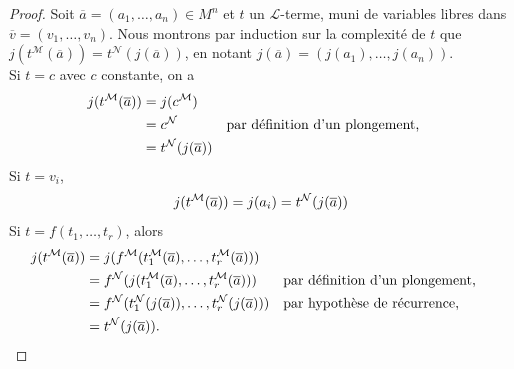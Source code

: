 \begin{proof}
Soit $\overline{a}=(a_1,\dots,a_n) \in M^n$ et $t$ un $\mathcal{L}$-terme, muni de variables libres dans $\overline{v} = (v_1,\dots,v_n)$.
Nous montrons par induction sur la complexité de $t$ que $j(t^{\mathcal{M}}(\overline{a}))
= t^{\mathcal{N}}(j(\overline{a}))$, en notant $j(\overline{a})=(j(a_1),\dots,j(a_n))$.\\[0.5cm]
    Si $t=c$ avec $c$ constante, on a 
    \begin{align*}
    j(t^{\mathcal{M}}(\overline{a})) &= j(c^{\mathcal{M}})\\
    &= c^{\mathcal{N}} && \text{par définition d'un plongement,} \\
    &= t^{\mathcal{N}}(j(\overline{a}))
    \end{align*}
    Si $t=v_i$,\[
    j(t^{\mathcal{M}}(\overline{a}))  = j(a_i) = t^{\mathcal{N}}(j(\overline{a}))\]
    Si $t=f(t_1, \ldots, t_r)$, alors
    \begin{align*}
    j(t^{\mathcal{M}}(\overline{a})) &= j(f^{\mathcal{M}}(t_1^{\mathcal{M}}(\overline{a}),\ldots, t_r^{\mathcal{M}}(\overline{a}))) \\
    & = f^{\mathcal{N}}(j(t_1^{\mathcal{M}}(\overline{a}),\ldots,t_r^{\mathcal{M}}(\overline{a}))) && \text{par définition d'un plongement,} \\
    & = f^{\mathcal{N}}(t_1^{\mathcal{N}}(j(\overline{a})),\ldots, t_r^{\mathcal{N}}(j(\overline{a}))) && \text{par hypothèse de récurrence,} \\
    & = t^{\mathcal{N}}(j(\overline{a})).
    \end{align*}


\end{proof}
